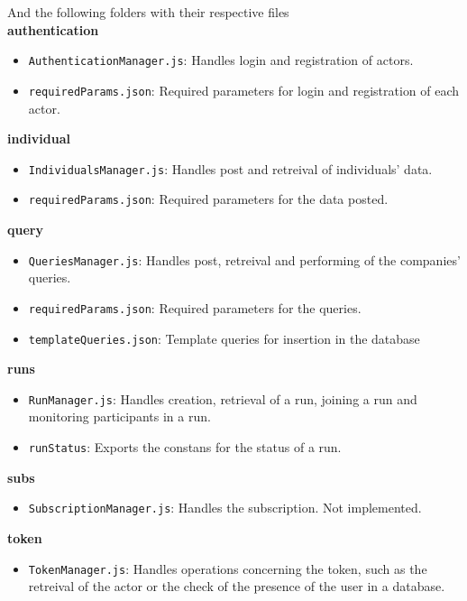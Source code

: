 And the following folders with their respective files \\
\noindent \textbf{authentication}
\begin{itemize}
    \item \texttt{AuthenticationManager.js}: Handles login and registration of actors.
    \item \texttt{requiredParams.json}: Required parameters for login and registration of each actor.
\end{itemize}

\noindent \textbf{individual}
\begin{itemize}
    \item \texttt{IndividualsManager.js}: Handles post and retreival of individuals' data.
    \item \texttt{requiredParams.json}: Required parameters for the data posted.
\end{itemize}

\noindent \textbf{query}
\begin{itemize}
    \item \texttt{QueriesManager.js}: Handles post, retreival and performing of the companies' queries.
    \item \texttt{requiredParams.json}: Required parameters for the queries.
    \item \texttt{templateQueries.json}: Template queries for insertion in the database 
\end{itemize}

\noindent \textbf{runs}
\begin{itemize}
    \item \texttt{RunManager.js}: Handles creation, retrieval of a run, joining a run and monitoring participants in a run.
    \item \texttt{runStatus}: Exports the constans for the status of a run.
\end{itemize}

\noindent \textbf{subs}
\begin{itemize}
    \item \texttt{SubscriptionManager.js}: Handles the subscription. Not implemented.
\end{itemize}

\noindent \textbf{token}
\begin{itemize}
    \item \texttt{TokenManager.js}: Handles operations concerning the token, such as the retreival of the actor or the check of the presence of the user in a database.
\end{itemize}

